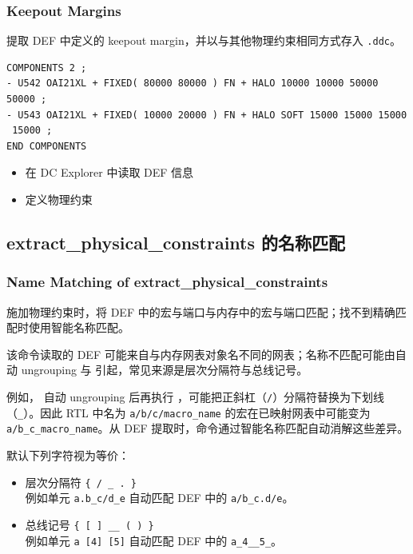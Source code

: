 \subsubsection*{Keepout Margins}

 提取 DEF 中定义的 keepout margin，并以与其他物理约束相同方式存入 \texttt{.ddc}。

\begin{lstlisting}
COMPONENTS 2 ;
- U542 OAI21XL + FIXED( 80000 80000 ) FN + HALO 10000 10000 50000 50000 ;
- U543 OAI21XL + FIXED( 10000 20000 ) FN + HALO SOFT 15000 15000 15000
 15000 ;
END COMPONENTS
\end{lstlisting}

\begin{seeAlsoBox}
\begin{itemize}
  \item 在 DC Explorer 中读取 DEF 信息
  \item 定义物理约束
\end{itemize}
\end{seeAlsoBox}

\subsection{extract\_physical\_constraints 的名称匹配}
\subsubsection*{Name Matching of extract\_physical\_constraints}

 施加物理约束时，将 DEF 中的宏与端口与内存中的宏与端口匹配；找不到精确匹配时使用智能名称匹配。

该命令读取的 DEF 可能来自与内存网表对象名不同的网表；名称不匹配可能由自动 ungrouping 与  引起，常见来源是层次分隔符与总线记号。

例如， 自动 ungrouping 后再执行 ，可能把正斜杠（\texttt{/}）分隔符替换为下划线（\texttt{\_}）。因此 RTL 中名为 \texttt{a/b/c/macro\_name} 的宏在已映射网表中可能变为 \texttt{a/b\_c\_macro\_name}。从 DEF 提取时，命令通过智能名称匹配自动消解这些差异。

默认下列字符视为等价：
\begin{itemize}
  \item 层次分隔符 \texttt{\{ / \_ . \}}\\
        例如单元 \texttt{a.b\_c/d\_e} 自动匹配 DEF 中的 \texttt{a/b\_c.d/e}。
  \item 总线记号 \texttt{\{ [ ] \_\_ ( ) \}}\\
        例如单元 \texttt{a [4] [5]} 自动匹配 DEF 中的 \texttt{a\_4\_\_5\_}。
\end{itemize}

